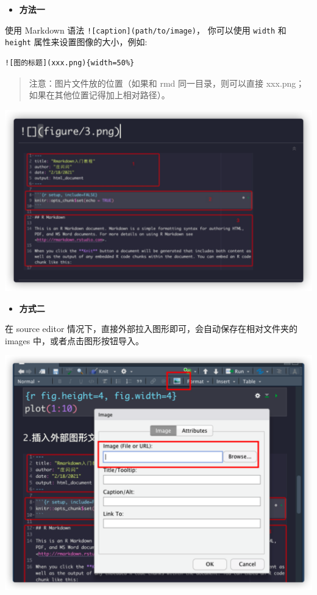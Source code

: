 \documentclass[
]{book}
\providecommand{\tightlist}{%
  \setlength{\itemsep}{0pt}\setlength{\parskip}{0pt}}
\begin{document}
\begin{itemize}
\tightlist
\item
  \textbf{方法一}
\end{itemize}

使用 Markdown 语法 \texttt{!{[}caption{]}(path/to/image)}， 你可以使用 \texttt{width} 和
\texttt{height} 属性来设置图像的大小，例如:

\begin{verbatim}
![图的标题](xxx.png){width=50%}
\end{verbatim}

\begin{quote}
注意：图片文件放的位置（如果和 rmd 同一目录，则可以直接 xxx.png；
如果在其他位置记得加上相对路径）。
\end{quote}

\includegraphics{images/paste-826D2A4B.png}

\begin{itemize}
\tightlist
\item
  \textbf{方式二}
\end{itemize}

在 source editor 情况下，直接外部拉入图形即可，会自动保存在相对文件夹的
images 中，或者点击图形按钮导入。

\includegraphics{images/paste-62C72EF4.png}
\end{document}
